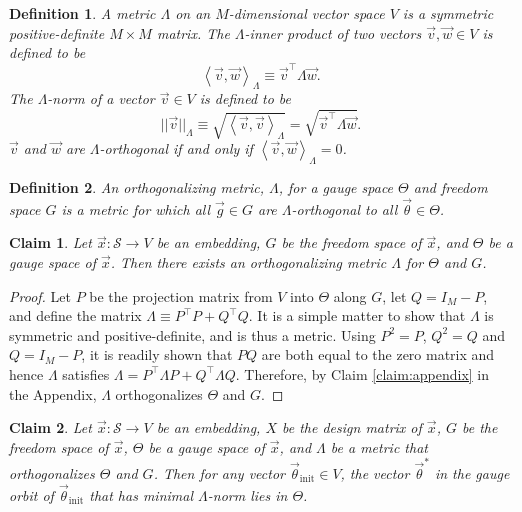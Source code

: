 \documentclass{article}
\numberwithin{myclaim}{section}
\newcommand{\braket}[1]{\left\langle #1 \right\rangle}
\newcommand{\myinit}{\mathrm{init}}
\newtheorem{claim}{Claim}
\newtheorem{definition}{Definition}
\begin{document}
\begin{definition}
A metric $\Lambda$ on an $M$-dimensional vector space $V$ is a symmetric positive-definite $M \times M$ matrix. The $\Lambda$-inner product of two vectors $\vec{v},\vec{w} \in V$ is defined to be 
\begin{equation}
    \braket{\vec{v}, \vec{w}}_\Lambda \equiv \vec{v}^\top \Lambda \vec{w}.
\end{equation}    
The $\Lambda$-norm of a vector $\vec{v}\in V$ is defined to be
\begin{equation}
    ||\vec{v}||_\Lambda \equiv \sqrt{\braket{\vec{v},\vec{v}}_\Lambda} = \sqrt{\vec{v}^\top \Lambda \vec{w}}.
\end{equation}
$\vec{v}$ and $\vec{w}$ are $\Lambda$-orthogonal if and only if $\braket{\vec{v}, \vec{w}}_\Lambda = 0$.
\end{definition}

\begin{definition}
An orthogonalizing metric, $\Lambda$, for a gauge space $\Theta$ and freedom space $G$ is a metric for which  all $\vec{g} \in G$ are $\Lambda$-orthogonal to all $\vec{\theta} \in \Theta$.
\end{definition}

\begin{claim}
Let $\vec{x}:\mathcal{S} \to V$ be an embedding, $G$ be the freedom space of $\vec{x}$, and $\Theta$ be a gauge space of $\vec{x}$. Then there exists an orthogonalizing metric $\Lambda$ for $\Theta$ and $G$. 
\end{claim}
\begin{proof}
Let $P$ be the projection matrix from $V$ into $\Theta$ along $G$, let $Q = I_M - P$, and define the matrix $\Lambda \equiv P^\top P + Q^\top Q$. It is a simple matter to show that $\Lambda$ is symmetric and positive-definite, and is thus a metric. Using $P^2 = P$, $Q^2 = Q$ and $Q = I_M - P$, it is readily shown that $PQ$ are both equal to the zero matrix and hence $\Lambda$ satisfies $\Lambda = P^\top \Lambda P + Q^\top \Lambda Q.$ Therefore, by Claim \ref{claim:appendix} in the Appendix, $\Lambda$ orthogonalizes $\Theta$ and $G$.
\end{proof}

\begin{claim}
Let $\vec{x}:\mathcal{S} \to V$ be an embedding, $X$ be the design matrix of $\vec{x}$, $G$ be the freedom space of $\vec{x}$, $\Theta$ be a gauge space of $\vec{x}$, and $\Lambda$ be a metric that orthogonalizes $\Theta$ and $G$. Then for any vector $\vec{\theta}_\myinit \in V$, the vector $\vec{\theta}^*$ in the gauge orbit of $\vec{\theta}_\myinit$ that has minimal $\Lambda$-norm lies in $\Theta$. 
\end{claim}
\end{document}
